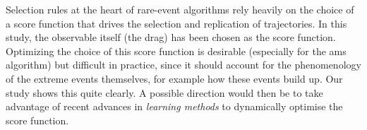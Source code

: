 %
Selection rules at the heart of rare-event algorithms rely heavily on the choice of a score function that drives the selection and replication of trajectories. 
In this study, the observable itself (the drag) has been chosen as the score function.
Optimizing the choice of this score function is desirable (especially for the \ac{ams} algorithm) but difficult in practice, since it should account for the phenomenology of the extreme events themselves, for example how these events build up. Our study shows this quite clearly. A possible direction would then be to take advantage of recent advances in \emph{learning methods} to dynamically optimise the score function.